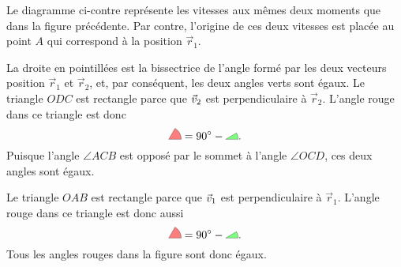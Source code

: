 \documentclass{tufte-handout}
\begin{document}
Le diagramme ci-contre représente les vitesses aux mêmes deux moments que dans
la figure précédente.  Par contre, l'origine de ces deux vitesses est placée au
point $A$ qui correspond à la position $\vec{r}_1$.
\begin{marginfigure}
\end{marginfigure}
La droite en pointillées est la bissectrice de l'angle formé par les deux
vecteurs position $\vec{r}_1$ et $\vec{r}_2$, et, par conséquent, les deux
angles verts sont égaux.  Le triangle $ODC$ est rectangle parce que $\vec{v}_2$ est
perpendiculaire à $\vec{r}_2$.  L'angle rouge dans ce triangle est donc
\[
  \tikz{\filldraw[fill=red, opacity=0.5]
          (0, 0) -- (0.4, 0) arc (0:60:0.4) -- cycle;} = 
  \SI{90}{\degree} -
  \tikz{\filldraw[fill=green, opacity=0.5]
          (0, 0) -- (0.4, 0) arc (0:30:0.4) -- cycle;}.
\]
Puisque l'angle $\angle ACB$ est opposé par le sommet à l'angle $\angle OCD$,
ces deux angles sont égaux.

Le triangle $OAB$ est rectangle parce que $\vec{v}_1$ est
perpendiculaire à $\vec{r}_1$.  L'angle rouge dans ce triangle est donc aussi
\[
  \tikz{\filldraw[fill=red, opacity=0.5]
          (0, 0) -- (0.4, 0) arc (0:60:0.4) -- cycle;} = 
  \SI{90}{\degree} -
  \tikz{\filldraw[fill=green, opacity=0.5]
          (0, 0) -- (0.4, 0) arc (0:30:0.4) -- cycle;}.
\]
Tous les angles rouges dans la figure sont donc égaux.
\end{document}
